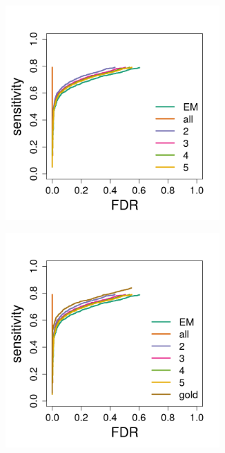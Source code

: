 \documentclass{article}
\begin{document}
\begin{figure}
  \centering
  \begin{subfigure}[t]{0.45\textwidth}
    \centering
    \includegraphics[width=0.9\textwidth]{figures/fp.png}
    \caption{ \label{fig:fp}}
  \end{subfigure}
  \qquad
  \begin{subfigure}[t]{0.450\textwidth}
    \centering
      \includegraphics[width=0.9\textwidth]{figures/gold.png}

\end{subfigure}
\end{figure}
\end{document}
